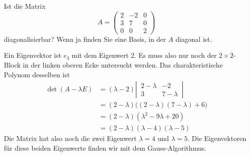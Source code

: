 Ist die Matrix
\[
A=
\begin{pmatrix}
2&-2&0\\
3& 7&0\\
0& 0&2
\end{pmatrix}
\]
diagonalisierbar? Wenn ja finden Sie eine Basis, in der $A$ diagonal ist.


\begin{loesung}
Ein Eigenvektor ist $e_3$ mit dem Eigenwert $2$. Es muss also nur noch
der $2\times 2$-Block in der linken oberen Ecke untersucht werden.
Das charakteristische Polynom desselben ist
\begin{align*}
\det(A-\lambda E)
&=
(\lambda -2)\left|\,\begin{matrix}2-\lambda&-2\\3&7-\lambda\end{matrix}\,\right|
\\
&=(2-\lambda)\bigl( (2-\lambda)(7-\lambda)+6 \bigr)
\\
&=(2-\lambda)(\lambda^2-9\lambda+20)
\\
&=(2-\lambda)(\lambda-4)(\lambda -5)
\end{align*}
Die Matrix hat also noch die zwei Eigenwert $\lambda=4$ und $\lambda=5$.
Die Eigenvektoren für diese beiden Eigenwerte finden wir mit dem
Gauss-Algorithmus.


\end{loesung}
